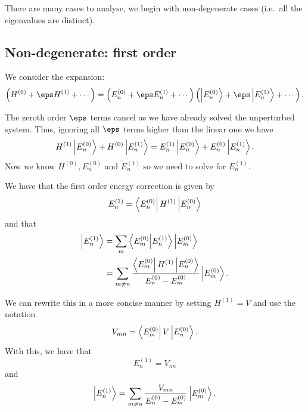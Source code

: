 \documentclass[12pt, a4paper]{article}
\begin{document}
There are many cases to analyse, we begin with non-degenerate cases (i.e.\ all the eigenvalues are distinct).

\subsection{Non-degenerate: first order}

We consider the expansion:
\[\left( H^{(0)} +\eps H^{(1)}+\cdots \right) = \left( E_n^{(0)} +\eps E_n^{(1)} +\cdots \right)\left( \ket{E_n^{(0)}} +\eps \ket{E_n^{(1)}}+\cdots \right).\]

The zeroth order \(\eps\) terms cancel as we have already solved the unperturbed system. Thus, ignoring all \(\eps\) terms higher than the linear one we have 
\[H^{(1)}\ket{E_n^{(0)}} + H^{(0)}\ket{E_n^{(1)}} = E_n^{(1)}\ket{E_n^{(0)}} + E_n^{(0)}\ket{E_n^{(1)}}.\]
Now we know \( H^{(0)}, E_n^{(0)} \) and \( E_n^{(1)} \) so we need to solve for \( E_n^{(1)} \).

\begin{mdprop}
    We have that the first order energy correction is given by 
    \[E_n^{(1)} = \bra{E_n^{(0)}} H^{(1)} \ket{E_n^{(0)}}\]
    and that 
    \[\begin{aligned}
        \ket{E_n^{(1)}} &= \sum_m \bra{E_m^{(0)}} \ket{E_n^{(1)}}\ket{E_m^{(0)}} \\
        &= \sum_{m\neq n} \frac{\bra{E_m^{(0)}} H^{(1)} \ket{E_n^{(0)}}}{E_n^{(0)}-E_m^{(0)}}\ket{E_m^{(0)}}.
    \end{aligned}\]
\end{mdprop}

\begin{mdremark}
    We can rewrite this in a more concise manner by setting \(H^{(1)}=V\) and use the notation 
    \[V_{mn} = \bra{E^{(0)}_m} V \ket{E^{(0)}_n}.\]
    With this, we have that 
    \[E_n^{(1)} = V_{nn}\]
    and 
    \[\ket{E_n^{(1)}} = \sum_{m\neq n}\frac{V_{mn}}{E_n^{(0)}-E_m^{(0)}}\ket{E_m^{(0)}}.\]
\end{mdremark}
\end{document}
